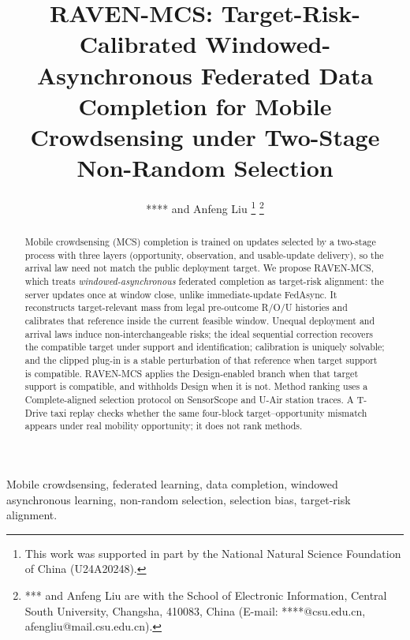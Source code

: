 \documentclass[letterpaper,journal]{IEEEtran}
\begin{document}
\title{RAVEN-MCS: Target-Risk-Calibrated Windowed-Asynchronous Federated Data Completion for Mobile Crowdsensing under Two-Stage Non-Random Selection}

\author{**** and Anfeng Liu%
\thanks{This work was supported in part by the National Natural Science Foundation of China (U24A20248).}%
\thanks{*** and Anfeng Liu are with the School of Electronic Information, Central South University, Changsha, 410083, China (E-mail: ****@csu.edu.cn, afengliu@mail.csu.edu.cn).}%
}


\maketitle





\begin{abstract}
Mobile crowdsensing (MCS) completion is trained on updates selected by a
two-stage process with three layers (opportunity, observation, and
usable-update delivery), so the arrival law need not match the public
deployment target.  We propose RAVEN-MCS, which treats
\emph{windowed-asynchronous} federated completion as target-risk alignment:
the server updates once at window close, unlike immediate-update FedAsync.
It reconstructs target-relevant mass from legal pre-outcome R/O/U histories
and calibrates that reference inside the current feasible window.
Unequal deployment and arrival laws induce non-interchangeable risks; the
ideal sequential correction recovers the compatible target under support
and identification; calibration is uniquely solvable; and the clipped
plug-in is a stable perturbation of that reference when target support is
compatible.  RAVEN-MCS applies the Design-enabled branch when that
target support is compatible, and withholds Design when it is not.
Method ranking uses a Complete-aligned selection protocol on SensorScope
and U-Air station traces.  A T-Drive taxi replay checks whether the same
four-block target--opportunity mismatch appears under real mobility
opportunity; it does not rank methods.
\end{abstract}

\begin{IEEEkeywords}
Mobile crowdsensing, federated learning, data completion, windowed asynchronous learning, non-random selection, selection bias, target-risk alignment.
\end{IEEEkeywords}
\end{document}
